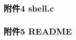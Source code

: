 \documentclass{article}
\begin{document}
    \subsubsection{附件4 shell.c}

    

    \subsubsection{附件5 README}

    
\end{document}
